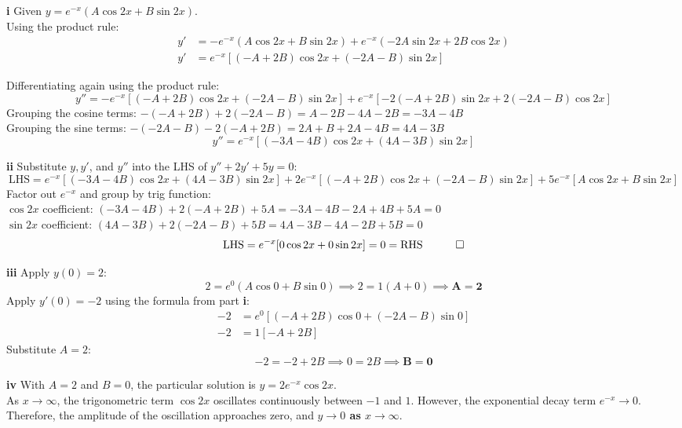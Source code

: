 \begin{solution}
\textbf{i} Given $y = e^{-x}(A \cos 2x + B \sin 2x)$. \\
Using the product rule:
\begin{align*}
    y' &= -e^{-x}(A \cos 2x + B \sin 2x) + e^{-x}(-2A \sin 2x + 2B \cos 2x) \\
    y' &= e^{-x}[(-A + 2B)\cos 2x + (-2A - B)\sin 2x]
\end{align*}

Differentiating again using the product rule:
\[ y'' = -e^{-x}[(-A + 2B)\cos 2x + (-2A - B)\sin 2x] + e^{-x}[-2(-A + 2B)\sin 2x + 2(-2A - B)\cos 2x] \]
Grouping the cosine terms: $-(-A + 2B) + 2(-2A - B) = A - 2B - 4A - 2B = -3A - 4B$ \\
Grouping the sine terms: $-(-2A - B) - 2(-A + 2B) = 2A + B + 2A - 4B = 4A - 3B$
\[ y'' = e^{-x}[(-3A - 4B)\cos 2x + (4A - 3B)\sin 2x] \]

\vspace{0.3cm}
\textbf{ii} Substitute $y, y'$, and $y''$ into the LHS of $y'' + 2y' + 5y = 0$:
\[ \text{LHS} = e^{-x}[(-3A - 4B)\cos 2x + (4A - 3B)\sin 2x] + 2e^{-x}[(-A + 2B)\cos 2x + (-2A - B)\sin 2x] + 5e^{-x}[A \cos 2x + B \sin 2x] \]
Factor out $e^{-x}$ and group by trig function: \\
$\cos 2x$ coefficient: $(-3A - 4B) + 2(-A + 2B) + 5A = -3A - 4B - 2A + 4B + 5A = 0$ \\
$\sin 2x$ coefficient: $(4A - 3B) + 2(-2A - B) + 5B = 4A - 3B - 4A - 2B + 5B = 0$
\[ \text{LHS} = e^{-x}[0 \cos 2x + 0 \sin 2x] = 0 = \text{RHS} \quad \qed \]

\vspace{0.3cm}
\textbf{iii} Apply $y(0) = 2$:
\[ 2 = e^0(A \cos 0 + B \sin 0) \implies 2 = 1(A + 0) \implies \mathbf{A = 2} \]
Apply $y'(0) = -2$ using the formula from part \textbf{i}:
\begin{align*}
    -2 &= e^0[(-A + 2B)\cos 0 + (-2A - B)\sin 0] \\
    -2 &= 1[-A + 2B]
\end{align*}
Substitute $A = 2$:
\[ -2 = -2 + 2B \implies 0 = 2B \implies \mathbf{B = 0} \]

\vspace{0.3cm}
\textbf{iv} With $A=2$ and $B=0$, the particular solution is $y = 2e^{-x}\cos 2x$. \\
As $x \to \infty$, the trigonometric term $\cos 2x$ oscillates continuously between $-1$ and $1$. However, the exponential decay term $e^{-x} \to 0$. \\
Therefore, the amplitude of the oscillation approaches zero, and \textbf{$y \to 0$ as $x \to \infty$}.
\end{solution}

